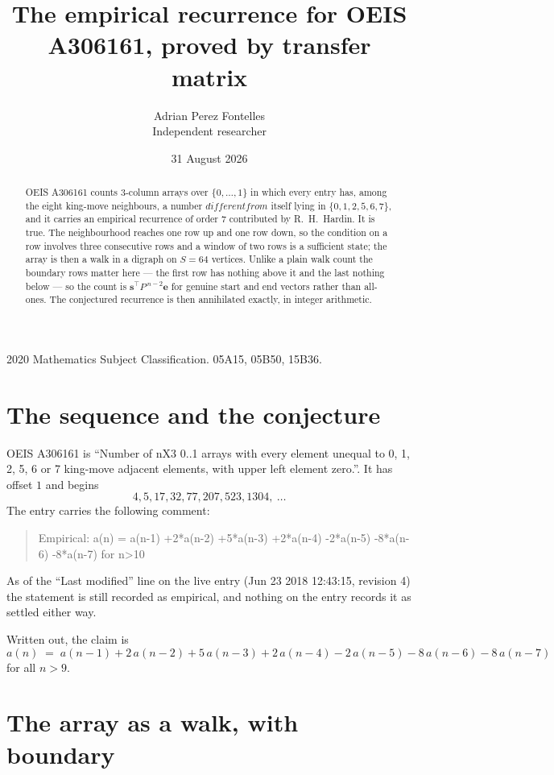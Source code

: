 \documentclass[11pt,a4paper]{article}
\title{The empirical recurrence for OEIS A306161, proved by transfer matrix}
\author{Adrian Perez Fontelles\\ \small Independent researcher}
\date{31 August 2026}
\theoremstyle{plain}
\theoremstyle{definition}
\begin{document}
\maketitle

\begin{abstract}
OEIS A306161 counts $3$-column arrays over $\{0,\dots,1\}$ in which every entry has,
among the eight king-move neighbours, a number $different from$ itself lying in $\{0,1,2,5,6,7\}$, and it carries an empirical
recurrence of order $7$ contributed by R.~H.~Hardin. It is true. The neighbourhood
reaches one row up and one row down, so the condition on a row involves three consecutive
rows and a window of two rows is a sufficient state; the array is then a walk in a digraph
on $S=64$ vertices. Unlike a plain walk count the boundary rows matter here --- the first
row has nothing above it and the last nothing below --- so the count is
$\mathbf{s}^{\!\top}P^{\,n-2}\mathbf{e}$ for genuine start and end vectors rather than
all-ones. The conjectured recurrence is then annihilated exactly, in integer arithmetic.
\end{abstract}

\noindent\small 2020 Mathematics Subject Classification. 05A15, 05B50, 15B36.\normalsize

\section{The sequence and the conjecture}

OEIS A306161 is ``Number of nX3 0..1 arrays with every element unequal to 0, 1, 2, 5, 6 or 7 king-move adjacent elements, with upper left element zero.''. It has offset
$1$ and begins
\[
4, 5, 17, 32, 77, 207, 523, 1304,\ \dots
\]
The entry carries the following comment:
\begin{quote}\small
Empirical: a(n) = a(n-1) +2*a(n-2) +5*a(n-3) +2*a(n-4) -2*a(n-5) -8*a(n-6) -8*a(n-7) for n>10
\end{quote}
As of the ``Last modified'' line on the live entry (Jun 23 2018 12:43:15, revision
4) the statement is still recorded as empirical, and nothing on the entry
records it as settled either way.

Written out, the claim is
\begin{equation}\label{eq:conj}
a(n)\;=\;a(n-1) + 2\,a(n-2) + 5\,a(n-3) + 2\,a(n-4) - 2\,a(n-5) - 8\,a(n-6) - 8\,a(n-7)
\end{equation}
for all $n>9$.

\section{The array as a walk, with boundary}
\end{document}
